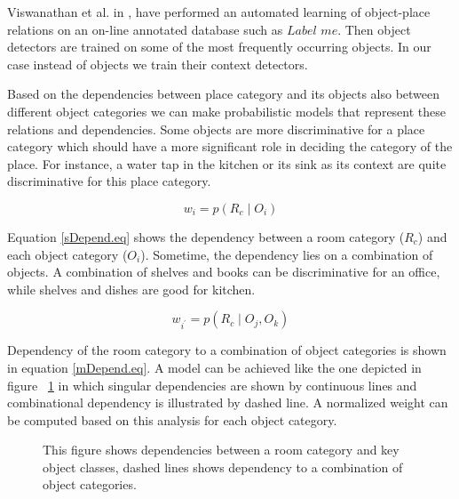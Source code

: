 Viswanathan et al. in \cite{P.Viswanathan}, have performed an automated learning of object-place relations on an on-line annotated database such as $Label$ $me$. 
Then object detectors are trained on some of the most frequently occurring objects.
In our case instead of objects we train their context detectors.

Based on the dependencies between place category and its objects also between different object categories we can make 
probabilistic models that represent these relations and dependencies.
Some objects are more discriminative for a place category which should have a more significant role in deciding the 
category of the place.
For instance, a water tap in the kitchen or its sink as its context are quite discriminative for this place category.

\begin{equation}
 \label{sDepend.eq}
 w_i = p(R_c \mid O_i) 
\end{equation}

Equation \ref{sDepend.eq} shows the dependency between a room category ($R_c$) and each object category ($O_i$).
Sometime, the dependency lies on a combination of objects.
A combination of shelves and books can be discriminative for an office, while shelves and dishes are good for kitchen.

\begin{equation}
 \label{mDepend.eq}
 w_{i^{'}} = p(R_c \mid O_j,O_k)
\end{equation}

Dependency of the room category to a combination of object categories is shown in equation \ref{mDepend.eq}. 
A model can be achieved like the one depicted in figure ~\ref{RoomObjectDepend.figure} in which singular dependencies are shown by continuous 
lines and combinational dependency is illustrated by dashed line.
A normalized weight can be computed based on this analysis for each object category.  

 \begin{figure}[t]
  \caption[Probabilistic graphical model of place-object.]
  {This figure shows dependencies between a room category and key object classes, dashed lines shows dependency to a combination of object categories.}
  \label{RoomObjectDepend.figure}
\end{figure}

 
